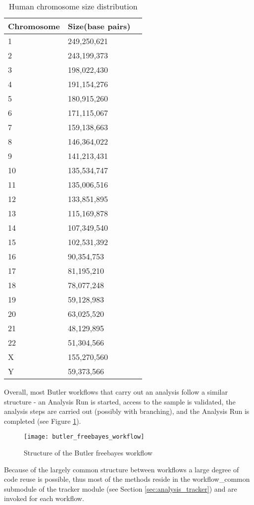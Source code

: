 \begin{table}[H]
\label{tab:chromosome_sizes}
\renewcommand{\arraystretch}{1.2} 
\centering
\begin{tabular}{@{}lll@{}}
\toprule
Chromosome & Size(base pairs)\\
\midrule
1 & 249,250,621\\
2 & 243,199,373\\
3 & 198,022,430\\
4 & 191,154,276\\
5 & 180,915,260\\
6 & 171,115,067\\
7 & 159,138,663\\
8 & 146,364,022\\
9 & 141,213,431\\
10 & 135,534,747\\
11 & 135,006,516\\
12 & 133,851,895\\
13 & 115,169,878\\
14 & 107,349,540\\
15 & 102,531,392\\
16 & 90,354,753\\
17 & 81,195,210\\
18 & 78,077,248\\
19 & 59,128,983\\
20 & 63,025,520\\
21 & 48,129,895\\
22 & 51,304,566\\
X & 155,270,560\\
Y & 59,373,566\\
\bottomrule
\end{tabular}
\caption{Human chromosome size distribution}
\end{table}

Overall, most Butler workflows that carry out an analysis follow a similar structure - an Analysis Run is started, access to the sample is validated, the analysis steps are carried out (possibly with branching), and the Analysis Run is completed (see Figure \ref{fig:butler_freebayes_workflow}).

\begin{figure}[H]
\texttt{[image: butler\_freebayes\_workflow]}
\centering
\caption {Structure of the Butler freebayes workflow}
\label{fig:butler_freebayes_workflow}
\end{figure}

Because of the largely common structure between workflows a large degree of code reuse is possible, thus most of the methods reside in the workflow\_common submodule of the tracker module (see Section \ref{sec:analysis_tracker}) and are invoked for each workflow.

